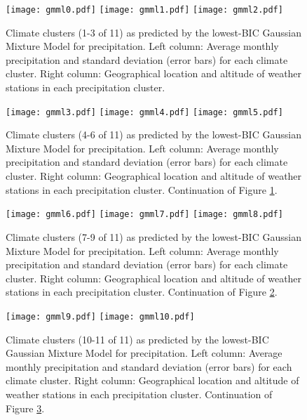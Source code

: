 \documentclass[12pt]{iopart}
\begin{document}
\begin{figure}
\begin{center}
\texttt{[image: gmml0.pdf]}
\texttt{[image: gmml1.pdf]}
\texttt{[image: gmml2.pdf]}
\caption{Climate clusters (1-3 of 11) as predicted by the lowest-BIC Gaussian Mixture Model for precipitation. Left column: Average monthly precipitation and standard deviation (error bars) for each climate cluster. Right column: Geographical location and altitude of weather stations in each precipitation cluster.}\label{clustl}
\end{center}
\end{figure}

\begin{figure}
\begin{center}
\texttt{[image: gmml3.pdf]}
\texttt{[image: gmml4.pdf]}
\texttt{[image: gmml5.pdf]}
\caption{Climate clusters  (4-6 of 11) as predicted by the lowest-BIC Gaussian Mixture Model for precipitation. Left column: Average monthly precipitation and standard deviation (error bars) for each climate cluster. Right column: Geographical location and altitude of weather stations in each precipitation cluster. Continuation of Figure \ref{clustl}.}\label{clustl2}
\end{center}
\end{figure}

\begin{figure}
\begin{center}

\texttt{[image: gmml6.pdf]}
\texttt{[image: gmml7.pdf]}
\texttt{[image: gmml8.pdf]}
\caption{Climate clusters (7-9 of 11) as predicted by the lowest-BIC Gaussian Mixture Model for precipitation. Left column: Average monthly precipitation and standard deviation (error bars) for each climate cluster. Right column: Geographical location and altitude of weather stations in each precipitation cluster. Continuation of Figure \ref{clustl2}.}\label{clustl3}
\end{center}
\end{figure}

\begin{figure}
\begin{center}
\texttt{[image: gmml9.pdf]}
\texttt{[image: gmml10.pdf]}
\caption{Climate clusters (10-11 of 11) as predicted by the lowest-BIC Gaussian Mixture Model for precipitation. Left column: Average monthly precipitation and standard deviation (error bars) for each climate cluster. Right column: Geographical location and altitude of weather stations in each precipitation cluster. Continuation of Figure \ref{clustl3}.}\label{clustl4}
\end{center}
\end{figure}
\end{document}
